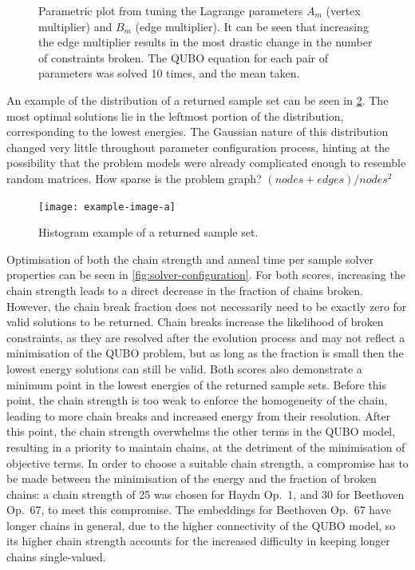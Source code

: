 \documentclass[12pt]{article}
\theoremstyle{definition}
\begin{document}
\begin{figure}
    \centering
    \small
    
    \caption{Parametric plot from tuning the Lagrange parameters $A_m$ (vertex multiplier) and $B_m$ (edge multiplier). It can be seen that increasing the edge multiplier results in the most drastic change in the number of constraints broken. The QUBO equation for each pair of parameters was solved 10 times, and the mean taken.}
    \label{fig:lagrange}
\end{figure}

An example of the distribution of a returned sample set can be seen in \cref{fig:histogram}. The most optimal solutions lie in the leftmost portion of the distribution, corresponding to the lowest energies. The Gaussian nature of this distribution changed very little throughout parameter configuration process, hinting at the possibility that the problem models were already complicated enough to resemble random matrices. How sparse is the problem graph? $(nodes + edges)/nodes^2$

\begin{figure}
    \centering
    \texttt{[image: example-image-a]}
    \caption{Histogram example of a returned sample set.}
    \label{fig:histogram}
\end{figure}

Optimisation of both the chain strength and anneal time per sample solver properties can be seen in \cref{fig:solver-configuration}. For both scores, increasing the chain strength leads to a direct decrease in the fraction of chains broken. However, the chain break fraction does not necessarily need to be exactly zero for valid solutions to be returned. Chain breaks increase the likelihood of broken constraints, as they are resolved after the evolution process and may not reflect a minimisation of the QUBO problem, but as long as the fraction is small then the lowest energy solutions can still be valid. Both scores also demonstrate a minimum point in the lowest energies of the returned sample sets. Before this point, the chain strength is too weak to enforce the homogeneity of the chain, leading to more chain breaks and increased energy from their resolution. After this point, the chain strength overwhelms the other terms in the QUBO model, resulting in a priority to maintain chains, at the detriment of the minimisation of objective terms. In order to choose a suitable chain strength, a compromise has to be made between the minimisation of the energy and the fraction of broken chains: a chain strength of \num{25} was chosen for Haydn Op.\ 1, and \num{30} for Beethoven Op.\ 67, to meet this compromise. The embeddings for Beethoven Op.\ 67 have longer chains in general, due to the higher connectivity of the QUBO model, so its higher chain strength accounts for the increased difficulty in keeping longer chains single-valued.
\end{document}
